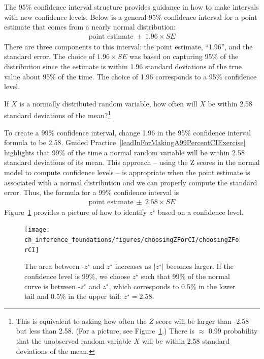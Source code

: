 The 95\% confidence interval structure provides guidance in how to make intervals with new confidence levels. Below is a general 95\% confidence interval for a point estimate that comes from a nearly normal distribution:
\begin{eqnarray}
\text{point estimate}\ \pm\ 1.96\times SE
\end{eqnarray}
There are three components to this interval: the point estimate, ``1.96'', and the standard error. The choice of $1.96\times SE$ was based on capturing 95\% of the distribution since the estimate is within 1.96 standard deviations of the true value about 95\% of the time. The choice of 1.96 corresponds to a 95\% confidence level. 

\begin{exercise} \label{leadInForMakingA99PercentCIExercise}
If $X$ is a normally distributed random variable, how often will $X$ be within 2.58 standard deviations of the mean?\footnote{This is equivalent to asking how often the $Z$ score will be larger than -2.58 but less than 2.58. (For a picture, see Figure~\ref{choosingZForCI}.) There is $\approx$ 0.99 probability that the unobserved random variable $X$ will be within 2.58 standard deviations of the mean.}
\end{exercise}

To create a 99\% confidence interval, change 1.96 in the 95\% confidence interval formula to be $2.58$. Guided Practice~\ref{leadInForMakingA99PercentCIExercise} highlights that 99\% of the time a normal random variable will be within 2.58 standard deviations of its mean. This approach -- using the Z scores in the normal model to compute confidence levels -- is appropriate when the point estimate is associated with a normal distribution and we can properly compute the standard error. Thus, the formula for a 99\% confidence interval is
\begin{eqnarray}
\text{point estimate}\ \pm\ 2.58\times SE
\label{99PercCIForMean}
\label{99PercCIForNormalPointEstimate}
\end{eqnarray}
Figure~\ref{choosingZForCI} provides a picture of how to identify $z^{\star}$ based on a confidence level. 

\begin{figure}[ht]
\centering
\texttt{[image: ch\_inference\_foundations/figures/choosingZForCI/choosingZForCI]}
\caption{The area between -$z^{\star}$ and $z^{\star}$ increases as $|z^{\star}|$ becomes larger. If the confidence level is 99\%, we choose $z^{\star}$ such that 99\% of the normal curve is between -$z^{\star}$ and $z^{\star}$, which corresponds to 0.5\% in the lower tail and 0.5\% in the upper tail: $z^{\star}=2.58$.}
\label{choosingZForCI}
\end{figure}

